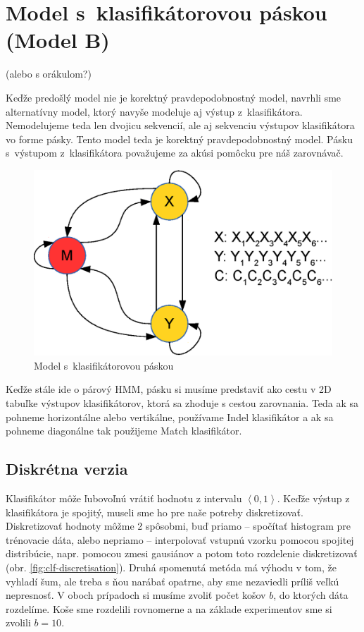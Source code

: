 \section[Model s~klasifikátorovou páskou]{Model s~klasifikátorovou páskou (Model B)}
\label{sec:model-tape}
(\todo alebo s orákulom?)

Keďže predošlý model nie je korektný pravdepodobnostný model, navrhli sme alternatívny model, ktorý navyše modeluje aj výstup z~klasifikátora.
Nemodelujeme teda len dvojicu sekvencií, ale aj sekvenciu výstupov klasifikátora vo forme pásky. Tento model teda je korektný pravdepodobnostný model.
Pásku s~výstupom z~klasifikátora považujeme za akúsi pomôcku pre náš zarovnávač.

\begin{figure}[htp]
    \centering
    \includegraphics[width=.5\textwidth]{images/model_clf_paska}
    \caption{Model s~klasifikátorovou páskou}
\end{figure}

Keďže stále ide o párový HMM, pásku si musíme predstaviť ako cestu v 2D tabuľke výstupov klasifikátorov, ktorá sa zhoduje s cestou zarovnania. Teda ak sa pohneme horizontálne  alebo vertikálne, používame Indel klasifikátor a ak sa pohneme diagonálne tak použijeme Match klasifikátor.

\subsection{Diskrétna verzia}

Klasifikátor môže ľubovoľnú vrátiť hodnotu z intervalu $\left<0,1 \right>$. Keďže výstup z klasifikátora je spojitý, museli sme ho pre naše potreby diskretizovať.
Diskretizovať hodnoty môžme 2 spôsobmi, buď priamo -- spočítať histogram pre trénovacie dáta, alebo nepriamo -- interpolovať vstupnú vzorku pomocou spojitej distribúcie, napr. pomocou zmesi gausiánov a potom toto rozdelenie diskretizovať (obr. \ref{fig:clf-discretisation}). Druhá spomenutá metóda má výhodu v tom, že vyhladí šum, ale treba s ňou narábať opatrne, aby sme nezaviedli príliš veľkú nepresnosť. V oboch prípadoch si musíme zvoliť počet košov $b$, do ktorých dáta rozdelíme. Koše sme rozdelili rovnomerne a na základe experimentov sme si zvolili $b = 10$.

